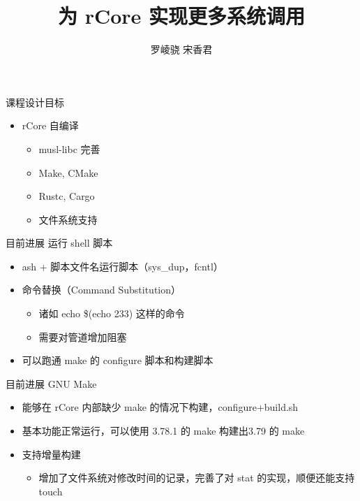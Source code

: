 \documentclass{beamer}
\title{为 rCore 实现更多系统调用}
\author{罗崚骁 \quad 宋香君}
\begin{document}
\begin{frame}
    \titlepage
\end{frame}

\begin{frame}{课程设计目标}
    \begin{itemize}
        \setlength{\itemsep}{10pt}
        \item rCore 自编译
        \begin{itemize}
            \setlength{\itemsep}{10pt}
            \item musl-libc 完善
            \item Make, CMake
            \item Rustc, Cargo
            \item 文件系统支持
        \end{itemize}
    \end{itemize}
\end{frame}

\begin{frame}{目前进展}
    {运行 shell 脚本}
    \begin{itemize}
        \setlength{\itemsep}{10pt}
        \item ash + 脚本文件名运行脚本（sys\_dup，fcntl）
        \item 命令替换（Command Substitution）
        \begin{itemize}
        \setlength{\itemsep}{10pt}
            \item 诸如 echo \$(echo 233) 这样的命令
            \item 需要对管道增加阻塞
        \end{itemize}
        \item 可以跑通 make 的 configure 脚本和构建脚本
    \end{itemize}
\end{frame}

\begin{frame}{目前进展}
    {GNU Make}
    \begin{itemize}
        \setlength{\itemsep}{10pt}
        \item 能够在 rCore 内部缺少 make 的情况下构建，configure+build.sh
        \item 基本功能正常运行，可以使用 3.78.1 的 make 构建出3.79 的 make
        \item 支持增量构建
        \begin{itemize}
            \item 增加了文件系统对修改时间的记录，完善了对 stat 的实现，顺便还能支持 touch
        \end{itemize}
    \end{itemize}
\end{frame}
\end{document}
